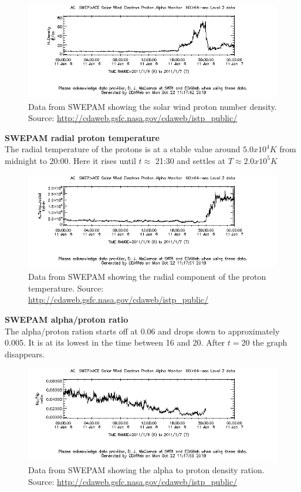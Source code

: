 \documentclass[norsk,a4paper,11pt]{article}
\begin{document}
\begin{multicols}{2}
\begin{figure}[H]
	\includegraphics[scale=0.4]{Figures/ACE_H_Density.png}
	\centering
	\caption{Data from SWEPAM showing the solar wind proton number density. Source: \url{http://cdaweb.gsfc.nasa.gov/cdaweb/istp_public/}}
	\label{fig:ACE_H_Density}
\end{figure}


\textbf{SWEPAM radial proton temperature}\\
The radial temperature of the protons is at a stable value around $5.0x10^4 K$ from midnight to 20:00. Here it rises until $t \approx$ 21:30 and settles at $T \approx 2.0x10^5 K$

\begin{figure}[H]
	\includegraphics[scale=0.4]{Figures/ACE_H_Temp_radial.png}
	\centering
	\caption{Data from SWEPAM showing the radial component of the proton temperature. Source: \url{http://cdaweb.gsfc.nasa.gov/cdaweb/istp_public/}}
	\label{fig:ACE_temp}
\end{figure}



\textbf{SWEPAM alpha/proton ratio}\\
The alpha/proton ration starts off at 0.06 and drops down to approximately 0.005. It is at its lowest in the time between 16 and 20. After $t=20$ the graph disappears.

\begin{figure}[H]
	\includegraphics[scale=0.4]{Figures/ACE_Na_Np.png}
	\centering
	\caption{Data from SWEPAM showing the alpha to proton density ration. Source: \url{http://cdaweb.gsfc.nasa.gov/cdaweb/istp_public/}}
	\label{fig:ACE_na_np}
\end{figure}



\end{multicols}
\end{document}
